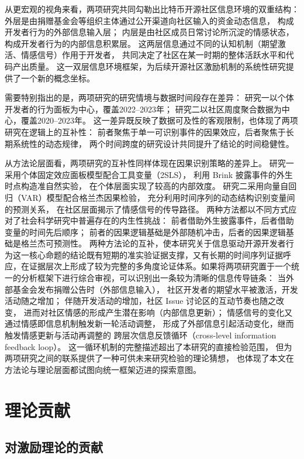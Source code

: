 \documentclass[
    type = master, %
    degree = professional,        %
    decl-page,  %
    twoside,                %
    fontset = fandol %
  ]{njuthesis}
\begin{document}
从更宏观的视角来看，两项研究共同勾勒出比特币开源社区信息环境的双重结构：
外层是由捐赠基金会等组织主体通过公开渠道向社区输入的资金动态信息，
构成开发者行为的外部信息输入层；
内层是由社区成员日常讨论所沉淀的情感状态，
构成开发者行为的内部信息积累层。
这两层信息通过不同的认知机制（期望激活、情感信号）作用于开发者，
共同决定了社区在某一时期的整体活跃水平和代码产出质量。
这一双层信息环境框架，为后续开源社区激励机制的系统性研究提供了一个新的概念坐标。

需要特别指出的是，两项研究的研究情境与数据时间段存在差异：
研究一以个体开发者的行为面板为中心，覆盖2022--2023年；
研究二以社区周度聚合数据为中心，覆盖2020--2023年。
这一差异既反映了数据可及性的客观限制，也体现了两项研究在逻辑上的互补性：
前者聚焦于单一可识别事件的因果效应，后者聚焦于长期系统性的动态规律，
两个时间跨度的研究设计共同提升了结论的时间稳健性。

从方法论层面看，两项研究的互补性同样体现在因果识别策略的差异上。
研究一采用个体固定效应面板模型配合工具变量（2SLS），
利用 Brink 披露事件的外生时点构造准自然实验，
在个体层面实现了较高的内部效度。
研究二采用向量自回归（VAR）模型配合格兰杰因果检验，
充分利用时间序列的动态结构识别变量间的预测关系，
在社区层面揭示了情感信号的传导路径。
两种方法都以不同方式应对了社会科学研究中普遍存在的内生性挑战：
前者借助外生披露事件，后者借助变量的时间先后顺序；
前者的因果逻辑基础是外部随机冲击，后者的因果逻辑基础是格兰杰可预测性。
两种方法论的互补，使本研究关于信息驱动开源开发者行为这一核心命题的结论既有短期的准实验证据支撑，又有长期的时间序列证据呼应，在证据层次上形成了较为完整的多角度论证体系。如果将两项研究置于一个统一的分析框架下进行综合审视，可以识别出一条较为清晰的信息传导链条：
当外部基金会发布捐赠公告时（外部信息输入），
社区开发者的期望水平被激活，开发活动随之增加；
伴随开发活动的增加，社区 Issue 讨论区的互动节奏也随之改变，
进而对社区情感的形成产生潜在影响（内部信息更新）；
情感信号的变化又通过情感即信息机制触发新一轮活动调整，
形成了外部信息引起活动变化，继而触发情感更新与活动再调整的
跨层次信息反馈循环（cross-level information feedback loop）。
这一循环机制的完整描述超出了本研究的直接检验范围，
但为两项研究之间的联系提供了一种可供未来研究检验的理论猜想，
也体现了本文在方法论与理论层面都试图向统一框架迈进的探索意图。


\section{理论贡献}

\subsection{对激励理论的贡献}
\end{document}
